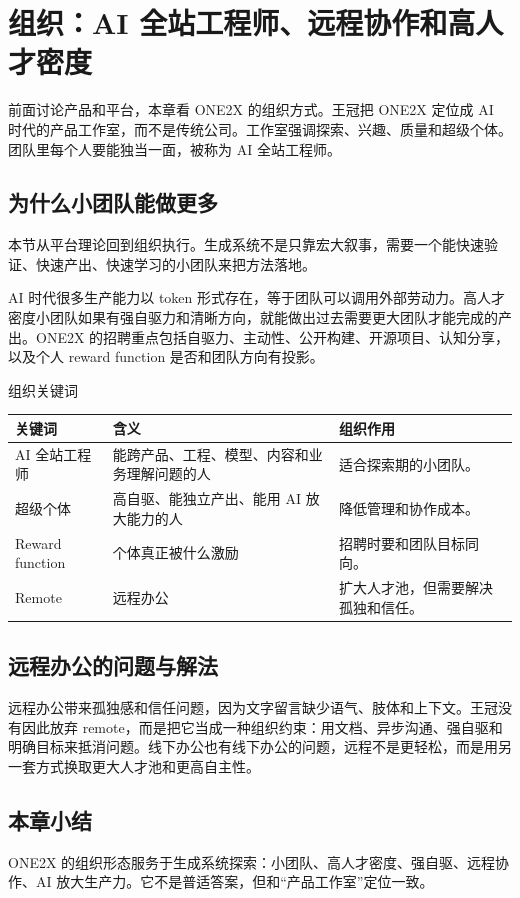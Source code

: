\section{组织：AI 全站工程师、远程协作和高人才密度}

前面讨论产品和平台，本章看 ONE2X 的组织方式。王冠把 ONE2X 定位成 AI 时代的产品工作室，而不是传统公司。工作室强调探索、兴趣、质量和超级个体。团队里每个人要能独当一面，被称为 AI 全站工程师。

\subsection{为什么小团队能做更多}

本节从平台理论回到组织执行。生成系统不是只靠宏大叙事，需要一个能快速验证、快速产出、快速学习的小团队来把方法落地。

AI 时代很多生产能力以 token 形式存在，等于团队可以调用外部劳动力。高人才密度小团队如果有强自驱力和清晰方向，就能做出过去需要更大团队才能完成的产出。ONE2X 的招聘重点包括自驱力、主动性、公开构建、开源项目、认知分享，以及个人 reward function 是否和团队方向有投影。

\begin{knowledgebox}{组织关键词}
\begin{tabularx}{\textwidth}{p{}p{}X}
\toprule
关键词 & 含义 & 组织作用 \\
\midrule
AI 全站工程师 & 能跨产品、工程、模型、内容和业务理解问题的人 & 适合探索期的小团队。 \\
超级个体 & 高自驱、能独立产出、能用 AI 放大能力的人 & 降低管理和协作成本。 \\
Reward function & 个体真正被什么激励 & 招聘时要和团队目标同向。 \\
Remote & 远程办公 & 扩大人才池，但需要解决孤独和信任。 \\
\bottomrule
\end{tabularx}
\end{knowledgebox}

\subsection{远程办公的问题与解法}

远程办公带来孤独感和信任问题，因为文字留言缺少语气、肢体和上下文。王冠没有因此放弃 remote，而是把它当成一种组织约束：用文档、异步沟通、强自驱和明确目标来抵消问题。线下办公也有线下办公的问题，远程不是更轻松，而是用另一套方式换取更大人才池和更高自主性。

\subsection{本章小结}

ONE2X 的组织形态服务于生成系统探索：小团队、高人才密度、强自驱、远程协作、AI 放大生产力。它不是普适答案，但和“产品工作室”定位一致。

